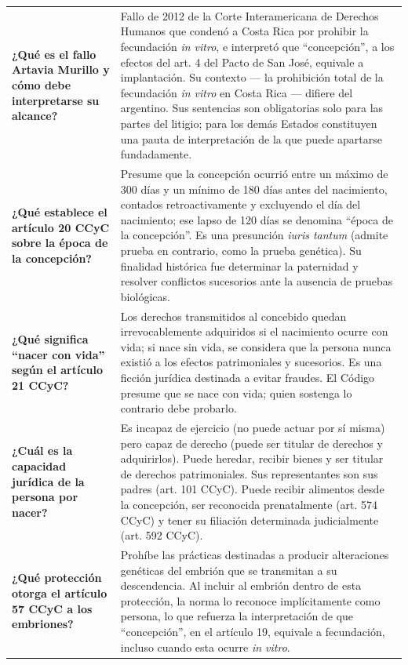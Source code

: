 \documentclass[12pt,oneside]{book}
\begin{document}
\begin{longtable}{
    >{\raggedright\arraybackslash}p{}
    >{\raggedright\arraybackslash}p{}
}
\textbf{¿Qué es el fallo Artavia Murillo y cómo debe interpretarse su alcance?} &
Fallo de 2012 de la Corte Interamericana de Derechos Humanos que condenó a Costa Rica por prohibir la fecundación \textit{in vitro}, e interpretó que ``concepción'', a los efectos del art. 4 del Pacto de San José, equivale a implantación. Su contexto --- la prohibición total de la fecundación \textit{in vitro} en Costa Rica --- difiere del argentino. Sus sentencias son obligatorias solo para las partes del litigio; para los demás Estados constituyen una pauta de interpretación de la que puede apartarse fundadamente. \\

\textbf{¿Qué establece el artículo 20 CCyC sobre la época de la concepción?} &
Presume que la concepción ocurrió entre un máximo de 300 días y un mínimo de 180 días antes del nacimiento, contados retroactivamente y excluyendo el día del nacimiento; ese lapso de 120 días se denomina ``época de la concepción''. Es una presunción \textit{iuris tantum} (admite prueba en contrario, como la prueba genética). Su finalidad histórica fue determinar la paternidad y resolver conflictos sucesorios ante la ausencia de pruebas biológicas. \\

\textbf{¿Qué significa ``nacer con vida'' según el artículo 21 CCyC?} &
Los derechos transmitidos al concebido quedan irrevocablemente adquiridos si el nacimiento ocurre con vida; si nace sin vida, se considera que la persona nunca existió a los efectos patrimoniales y sucesorios. Es una ficción jurídica destinada a evitar fraudes. El Código presume que se nace con vida; quien sostenga lo contrario debe probarlo. \\

\textbf{¿Cuál es la capacidad jurídica de la persona por nacer?} &
Es incapaz de ejercicio (no puede actuar por sí misma) pero capaz de derecho (puede ser titular de derechos y adquirirlos). Puede heredar, recibir bienes y ser titular de derechos patrimoniales. Sus representantes son sus padres (art. 101 CCyC). Puede recibir alimentos desde la concepción, ser reconocida prenatalmente (art. 574 CCyC) y tener su filiación determinada judicialmente (art. 592 CCyC). \\

\textbf{¿Qué protección otorga el artículo 57 CCyC a los embriones?} &
Prohíbe las prácticas destinadas a producir alteraciones genéticas del embrión que se transmitan a su descendencia. Al incluir al embrión dentro de esta protección, la norma lo reconoce implícitamente como persona, lo que refuerza la interpretación de que ``concepción'', en el artículo 19, equivale a fecundación, incluso cuando esta ocurre \textit{in vitro}. \\


\end{longtable}
\end{document}
